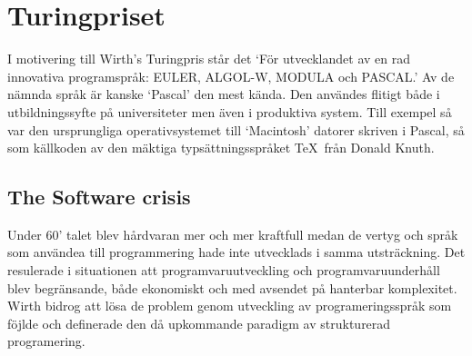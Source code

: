 \section{Turingpriset}
I motivering till Wirth's Turingpris står det `För utvecklandet av en rad 
innovativa programspråk: EULER, ALGOL-W, MODULA och PASCAL.' Av de nämnda språk 
är kanske `Pascal' den mest kända. Den användes flitigt både i utbildningssyfte 
på universiteter men även i produktiva system. Till exempel så var den ursprungliga
operativsystemet till `Macintosh' datorer skriven i Pascal, så som källkoden av
den mäktiga typsättningsspråket \TeX\ från Donald Knuth. 

\subsection{The Software crisis}
Under 60' talet blev hårdvaran mer och mer kraftfull medan de vertyg och språk som 
användea till programmering hade inte utvecklads i samma utsträckning. Det resulerade
i situationen att programvaruutveckling och programvaruunderhåll blev begränsande, 
både ekonomiskt och med avsendet på hanterbar komplexitet.
Wirth bidrog att lösa de problem genom utveckling av programeringsspråk som föjlde
och definerade den då upkommande paradigm av strukturerad programering.
 

